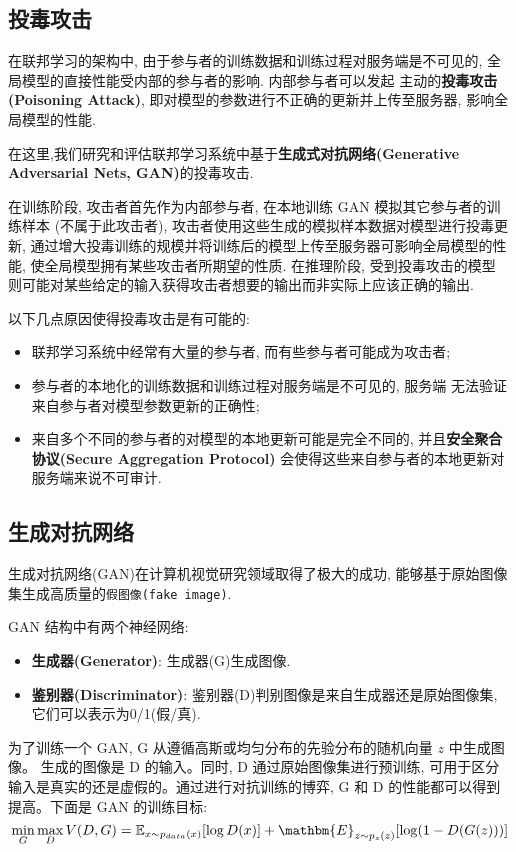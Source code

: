 \documentclass[../main.tex]{subfiles}
\begin{document}
\subsection{投毒攻击}
在联邦学习的架构中, 由于参与者的训练数据和训练过程对服务端是不可见的,
全局模型的直接性能受内部的参与者的影响. 内部参与者可以发起
主动的\textbf{投毒攻击(Poisoning Attack)}, 即对模型的参数进行不正确的更新并上传至服务器, 影响全局模型的性能.

在这里,我们研究和评估联邦学习系统中基于\textbf{生成式对抗网络(Generative
Adversarial Nets, GAN)}的投毒攻击.

在训练阶段, 攻击者首先作为内部参与者, 在本地训练 GAN 模拟其它参与者的训练样本
(不属于此攻击者), 攻击者使用这些生成的模拟样本数据对模型进行投毒更新,
通过增大投毒训练的规模并将训练后的模型上传至服务器可影响全局模型的性能,
使全局模型拥有某些攻击者所期望的性质. 在推理阶段, 受到投毒攻击的模型
则可能对某些给定的输入获得攻击者想要的输出而非实际上应该正确的输出.

以下几点原因使得投毒攻击是有可能的:
\begin{itemize}
  \item 联邦学习系统中经常有大量的参与者, 而有些参与者可能成为攻击者;
  \item 参与者的本地化的训练数据和训练过程对服务端是不可见的, 服务端
    无法验证来自参与者对模型参数更新的正确性;
  \item 来自多个不同的参与者的对模型的本地更新可能是完全不同的,
    并且\textbf{安全聚合协议(Secure Aggregation Protocol)}
    会使得这些来自参与者的本地更新对服务端来说不可审计.
\end{itemize}
%
\subsection{生成对抗网络}
生成对抗网络(GAN)在计算机视觉研究领域取得了极大的成功,
能够基于原始图像集生成高质量的\texttt{假图像(fake image)}.

GAN 结构中有两个神经网络:
\begin{itemize}
  \item \textbf{生成器(Generator)}: 生成器(G)生成图像.
  \item \textbf{鉴别器(Discriminator)}:
    鉴别器(D)判别图像是来自生成器还是原始图像集,
    它们可以表示为0/1(假/真).
\end{itemize}
%
为了训练一个 GAN, G 从遵循高斯或均匀分布的先验分布的随机向量 $ z $ 中生成图像。
生成的图像是 D 的输入。同时, D 通过原始图像集进行预训练,
可用于区分输入是真实的还是虚假的。通过进行对抗训练的博弈,
G 和 D 的性能都可以得到提高。下面是 GAN 的训练目标:
\begin{equation}
  \min_G\max_D V(D, G) = \mathbb{E}_{x\sim p_{data}(x)}[\log D(x)]
  + \mathbm{E}_{z\sim p_{z}(z)}[\log(1 - D(G(z)))]
\end{equation}
%
\end{document}

